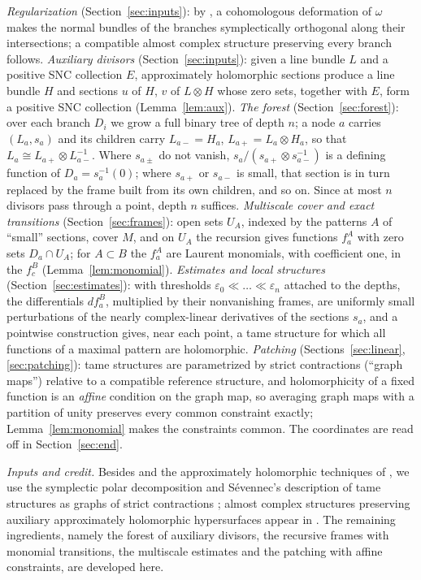\documentclass[11pt]{article}
\theoremstyle{remark}
\newcommand{\eps}{\varepsilon}
\begin{document}
\emph{Regularization} (Section~\ref{sec:inputs}): by
\cite[Theorem 2.13]{FMZ}, a cohomologous deformation of $\omega$ makes
the normal bundles of the branches symplectically orthogonal along
their intersections; a compatible almost complex structure preserving
every branch follows.
\emph{Auxiliary divisors} (Section~\ref{sec:inputs}): given a line
bundle $L$ and a positive SNC collection $E$, approximately holomorphic
sections \cite{Donaldson1996,Auroux1997,Mohsen2019} produce a line
bundle $H$ and sections $u$ of $H$, $v$ of $L\otimes H$ whose zero sets,
together with $E$, form a positive SNC collection (Lemma~\ref{lem:aux}).
\emph{The forest} (Section~\ref{sec:forest}): over each branch $D_i$ we
grow a full binary tree of depth $n$; a node $a$ carries $(L_a,s_a)$ and
its children carry $L_{a-}=H_a$, $L_{a+}=L_a\otimes H_a$, so that
$L_a\cong L_{a+}\otimes L_{a-}^{-1}$. Where $s_{a\pm}$ do not vanish,
$s_a/(s_{a+}\otimes s_{a-}^{-1})$ is a defining function of
$D_a=s_a^{-1}(0)$; where $s_{a+}$ or $s_{a-}$ is small, that section is
in turn replaced by the frame built from its own children, and so on.
Since at most $n$ divisors pass
through a point, depth $n$ suffices.
\emph{Multiscale cover and exact transitions} (Section~\ref{sec:frames}):
open sets $U_A$, indexed by the patterns $A$ of ``small'' sections,
cover $M$, and on $U_A$ the recursion gives functions $f^A_a$ with zero
sets $D_a\cap U_A$; for $A\subset B$ the $f^A_a$ are Laurent monomials,
with coefficient one, in the $f^B_c$ (Lemma~\ref{lem:monomial}).
\emph{Estimates and local structures} (Section~\ref{sec:estimates}):
with thresholds $\eps_0\ll\dots\ll\eps_n$ attached to the depths, the
differentials $df^B_a$, multiplied by their nonvanishing frames, are
uniformly small perturbations of the nearly complex-linear derivatives
of the sections $s_a$, and a pointwise construction gives, near each
point, a tame structure for which all functions of a maximal pattern
are holomorphic.
\emph{Patching} (Sections~\ref{sec:linear}, \ref{sec:patching}): tame
structures are parametrized by strict contractions (``graph maps'')
relative to a compatible reference structure, and holomorphicity of a fixed
function is an \emph{affine} condition on the graph map, so averaging
graph maps with a partition of unity preserves every common constraint
exactly; Lemma~\ref{lem:monomial} makes the constraints common. The
coordinates are read off in Section~\ref{sec:end}.

\emph{Inputs and credit.}
Besides \cite[Theorem 2.13]{FMZ} and the approximately holomorphic
techniques of \cite{Donaldson1996,Auroux1997,Auroux2001,Mohsen2019},
we use the symplectic polar decomposition \cite[Theorem 2.16]{Wendl}
and S\'evennec's description of tame structures as graphs of strict
contractions \cite[Theorem 2.37]{Wendl}; almost complex structures
preserving auxiliary approximately holomorphic hypersurfaces appear in
\cite[Section 8]{CM}. The remaining ingredients, namely the forest of
auxiliary divisors, the recursive frames with monomial transitions, the
multiscale estimates and the patching with affine constraints, are
developed here.
\end{document}
